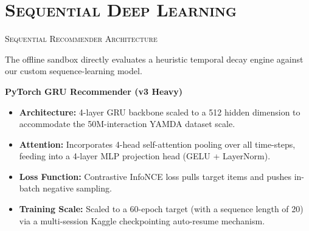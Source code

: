 \documentclass[xcolor=dvipsnames, aspectratio=1610]{beamer}
\begin{document}
\section{\textsc{Sequential Deep Learning}}
\begin{frame}{\textsc{Sequential Recommender Architecture}}

  The offline sandbox directly evaluates a heuristic temporal decay engine against our custom sequence-learning model.

  \vspace{2.5mm}
  \begin{ProposalBox}
    \textbf{PyTorch GRU Recommender (v3 Heavy)}
    \begin{itemize}
      \item \textbf{Architecture:} 4-layer GRU backbone scaled to a 512 hidden dimension to accommodate the 50M-interaction YAMDA dataset scale.
      \item \textbf{Attention:} Incorporates 4-head self-attention pooling over all time-steps, feeding into a 4-layer MLP projection head (GELU + LayerNorm).
      \item \textbf{Loss Function:} Contrastive InfoNCE loss pulls target items and pushes in-batch negative sampling.
      \item \textbf{Training Scale:} Scaled to a 60-epoch target (with a sequence length of 20) via a multi-session Kaggle checkpointing auto-resume mechanism.
    \end{itemize}
  \end{ProposalBox}

\end{frame}

\end{document}
